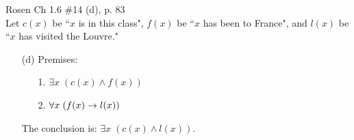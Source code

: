 \begin{questions}
 Rosen Ch 1.6 \#14 (d), p. 83 \\
Let $c(x)$ be ``$x$ is in this class", $f(x)$ be ``$x$ has been to France", and $l(x)$ be ``$x$ has visited the Louvre."
   \ifprintanswers
        \vspace{-10pt}
    \fi
\begin{solution}
    \begin{itemize}[itemsep=0pt,parsep=0pt,topsep=0pt,partopsep=0pt]
%
%
        \item[(d)] %
        Premises: 
        \begin{itemize}[itemsep=0pt,parsep=0pt,topsep=0pt,partopsep=0pt]
            \item[1.] $\exists x\; (c(x) \wedge f(x))$
            \item[2.] $\forall x\; (f(x) \rightarrow l(x))$
        \end{itemize}
        The conclusion is: $\exists x\; (c(x) \wedge l(x))$.


\end{itemize}
\end{solution}
\end{questions}
